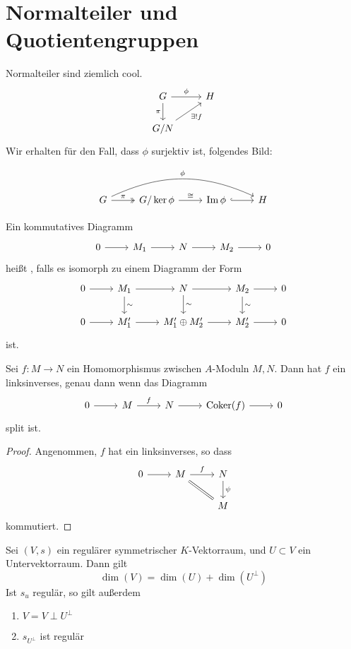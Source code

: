 \documentclass[11pt,twoside]{memoir}
\begin{document}
\section{Normalteiler und Quotientengruppen}
\begin{prop}
	Normalteiler sind ziemlich cool.
	\[
	\begin{tikzcd}
	G \ar{r}{\phi} \ar[swap]{d}{\pi} & H\\
	G/N \ar[swap]{ur}{\exists! f}
	\end{tikzcd}
	\]
	Wir erhalten für den Fall, dass $\phi$ surjektiv ist, folgendes Bild:

	\[
	\begin{tikzcd}
	G \ar[\surarr]{r}{\pi}  \ar[bend left = 25]{rrr}{\phi}& G/\ker\phi \ar{r}{\cong} & \im \phi \ar[\embarr]{r}{} & H
	\end{tikzcd}
	\]
\end{prop}
\lec
\begin{defn}
	Ein kommutatives Diagramm
	\[
	\begin{tikzcd}
	0\ar{r}&M_1\ar{r}&N\ar{r}&M_2\ar{r}&0
	\end{tikzcd}
	\]
	heißt , falls es isomorph zu einem Diagramm der Form
	\[
	\begin{tikzcd}
	0\ar{r}&M_1\ar{r}\ar{d}{\sim}&N\ar{r}\ar{d}{\sim}&M_2\ar{r}\ar{d}{\sim}&0\\
	0\ar{r}&M_1'\ar{r}&M_1'\oplus M_2'\ar{r}&M_2'\ar{r}&0
	\end{tikzcd}
	\]
	ist.
\end{defn}
\begin{prop}
	Sei $f\colon M\to N$ ein Homomorphismus zwischen $A$-Moduln $M,N$. Dann hat $f$ ein linksinverses, genau dann wenn das Diagramm
	\[
	\begin{tikzcd}
	0\ar{r}& M \ar{r}{f}& N\ar{r}&\mathrm{Coker}(f)\ar{r}&0
	\end{tikzcd}
	\]
	split ist.
\end{prop}
\begin{proof}
	Angenommen, $f$ hat ein linksinverses, so dass 
	\[
	\begin{tikzcd}
	0\ar{r}&M\ar{r}{f}\ar[swap,equal]{dr}&N\ar{d}{\psi}\\
			&&M
	\end{tikzcd}
	\]
	kommutiert.
\end{proof}
\begin{thm}
	Sei $(V,s)$ ein regulärer symmetrischer $K$-Vektorraum, und $U\subset V$ ein Untervektorraum. Dann gilt
	\[\dim(V) = \dim(U) + \dim(U^{\perp})\]
	Ist $s_u$ regulär, so gilt außerdem 
	\begin{enumerate}
		\item $V = V \perp U^{\perp}$
		\item $s_{U^{\perp}}$ ist regulär
	\end{enumerate}
\end{thm}
\end{document}
